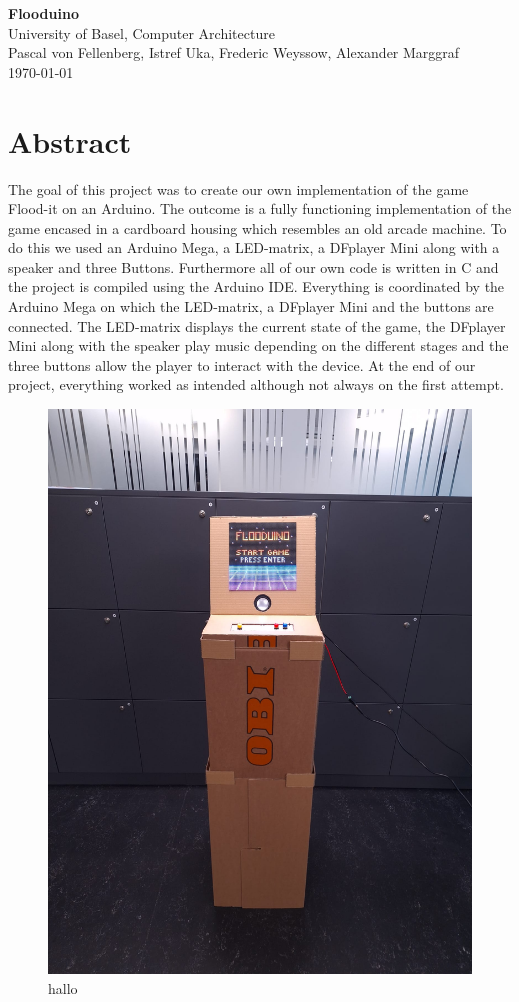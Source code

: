 \documentclass[12pt, a4paper]{article}
\begin{document}
\begin{center}
{\Huge \textbf{Flooduino}}\\
University of Basel, Computer Architecture\\
Pascal von Fellenberg, Istref Uka, Frederic Weyssow, Alexander Marggraf\\
\today
\end{center}

\section*{Abstract}

The goal of this project was to create our own implementation of the game Flood-it on an Arduino.  The outcome is a fully functioning implementation of the game encased in a cardboard housing which resembles an old arcade machine. To do this we used an Arduino Mega, a LED-matrix, a DFplayer Mini along with a speaker and three Buttons. Furthermore all of our own code is written in C and the project is compiled using the Arduino IDE. Everything is coordinated by the Arduino Mega on which the LED-matrix, a DFplayer Mini and the buttons are connected. The LED-matrix displays the current state of the game, the DFplayer Mini along with the speaker play music depending on the different stages and the three buttons allow the player to interact with the device. At the end of our project, everything worked as intended although not always on the first attempt. 

\begin{figure}[h]
    \centering
    \includegraphics[width=0.5\linewidth]{Finished_Product.jpg}
    \caption{hallo}
    \label{fig:enter-label}
\end{figure}
\end{document}
